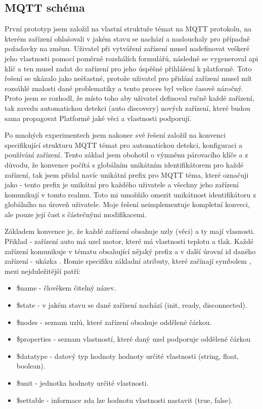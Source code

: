 \subsection{MQTT schéma}
První prototyp jsem založil na vlastní struktuře témat na MQTT protokolu, na kterém zařízení ohlašovali v jakém stavu se nachází a naslouchaly pro případně požadavky na změnu. Uživatel při vytváření zařízení musel nadefinovat veškeré jeho vlastnosti pomocí poměrně rozshálích formulářů, následně se vygeneroval api klíč a ten musel zadat do zařízení pro jeho úspěšné přihlášení k platformě. Toto řešení se ukázalo jako nešťastné, protože uživatel pro přidání zařízení musel mít rozsáhlé znalosti dané problematiky a tento proces byl velice časově náročný. Proto jsem se rozhodl, že místo toho aby uživatel definoval ručně každé zařízení, tak zavedu automatickou detekci (auto discovery) nových zařízení, které budou sama propagovat Platformě jaké věci a vlastnosti podporují.

Po mnohých experimentech jsem nakonec své řešení založil na konvenci  specifikující strukturu MQTT témat pro automatickou detekci, konfiguraci a používání zařízení. Tento základ jsem obohotil o výmněnu párovacího klíče a z důvodu, že konvence počítá s globálním unikátním identifikátorem pro každé zařízení, tak jsem přidal navíc unikátní  prefix pro MQTT téma, které označuji jako  - tento prefix je unikátní pro každého uživatele a všechny jeho zařízení komunikují v tomto realmu. Toto mi umožňilo omezit unikátnost identifikátoru z globálního na úroveň uživatele. Moje řešení neimplementuje kompletní konveci, ale pouze její čast s částečnými modifikacemi.

Základem  konvence je, že každé zařízení obsahuje uzly (věci) a ty mají vlasnosti. Přiklad - zařízení auto má uzel motor, které má vlastnosti teplotu a tlak. Každé zařízení komunikuje v tématu obsahující nějaký prefix a v další úrovní id daného zařízení - ukázka . Homie specifiku základní atributy, které začínají symbolem \uv{\$}, mezi nejduležitější patří:
\begin{itemize}
    \item \$name - člověkem čitelný název.
    \item \$state - v jakém stavu se dané zařízení nachází (init, ready, disconnected).
    \item \$nodes - seznam uzlů, které zařízení obsahuje oddělené čárkou.
    \item \$properties - seznam vlastností, které daný uzel podporuje oddělené čárkou
    \item \$datatype - datový typ hodnoty hodnoty určité vlastnosti (string, float, boolean).
    \item \$unit - jednotka hodnoty určité vlastnosti.
    \item \$settable - informace zda lze hodnotu vlastnosti nastavit (true, false).
\end{itemize}


